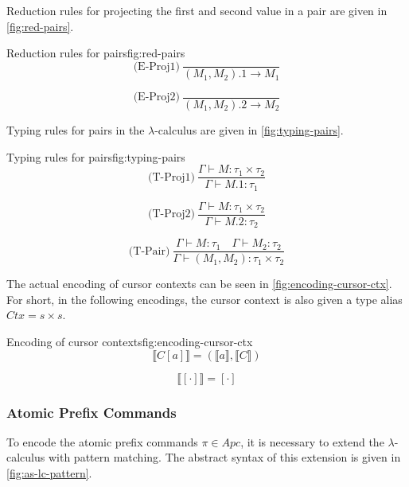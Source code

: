 Reduction rules for projecting the first and second value in a pair are given in \cref{fig:red-pairs}.

\begin{myfigure}{Reduction rules for pairs}{fig:red-pairs}
    \[
        \text{(E-Proj1)} \ \frac{}{(M_1,M_2).1 \rightarrow M_1}
    \]

    \[
        \text{(E-Proj2)} \ \frac{}{(M_1,M_2).2 \rightarrow M_2}
    \]
\end{myfigure}

Typing rules for pairs in the $\lambda$-calculus are given in \cref{fig:typing-pairs}.

\begin{myfigure}{Typing rules for pairs}{fig:typing-pairs}
    \[
        \text{(T-Proj1)} \ \frac{\Gamma \vdash M : \tau_1 \times \tau_2}{\Gamma \vdash M.1 : \tau_1}
    \]

    \[
        \text{(T-Proj2)} \ \frac{\Gamma \vdash M : \tau_1 \times \tau_2}{\Gamma \vdash M.2 : \tau_2}
    \]

    \[
        \text{(T-Pair)} \ \frac{\Gamma \vdash M : \tau_1 \quad \Gamma \vdash M_2 : \tau_2}{\Gamma \vdash (M_1,M_2) : \tau_1 \times \tau_2}
    \]
\end{myfigure}

The actual encoding of cursor contexts can be seen in \cref{fig:encoding-cursor-ctx}. For short, in the following encodings, the cursor context is also given a type alias $Ctx = s \times s$.

\begin{myfigure}{Encoding of cursor contexts}{fig:encoding-cursor-ctx}
    \[
        \llbracket C[a] \rrbracket = (\llbracket a \rrbracket, \llbracket C \rrbracket)
    \]

    \[
        \llbracket [\cdot] \rrbracket = [\cdot]
    \]
\end{myfigure}

\subsubsection{Atomic Prefix Commands}
To encode the atomic prefix commands $\pi \in Apc$, it is necessary to extend the $\lambda$-calculus with pattern matching. The abstract syntax of this extension is given in \cref{fig:as-lc-pattern}.

